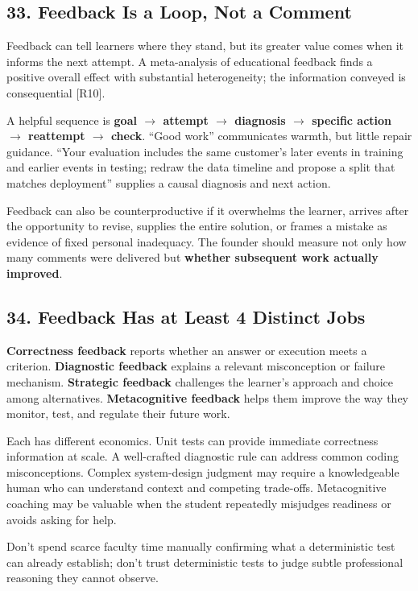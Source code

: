\subsection*{33. Feedback Is a Loop, Not a Comment}

Feedback can tell learners where they stand, but its greater value comes when it informs the next attempt. A meta-analysis of educational feedback finds a positive overall effect with substantial heterogeneity; the information conveyed is consequential [R10].

A helpful sequence is \textbf{goal $\to$ attempt $\to$ diagnosis $\to$ specific action $\to$ reattempt $\to$ check}. ``Good work'' communicates warmth, but little repair guidance. ``Your evaluation includes the same customer's later events in training and earlier events in testing; redraw the data timeline and propose a split that matches deployment'' supplies a causal diagnosis and next action.

Feedback can also be counterproductive if it overwhelms the learner, arrives after the opportunity to revise, supplies the entire solution, or frames a mistake as evidence of fixed personal inadequacy. The founder should measure not only how many comments were delivered but \textbf{whether subsequent work actually improved}.

\subsection*{34. Feedback Has at Least 4 Distinct Jobs}

\textbf{Correctness feedback} reports whether an answer or execution meets a criterion. \textbf{Diagnostic feedback} explains a relevant misconception or failure mechanism. \textbf{Strategic feedback} challenges the learner's approach and choice among alternatives. \textbf{Metacognitive feedback} helps them improve the way they monitor, test, and regulate their future work.

Each has different economics. Unit tests can provide immediate correctness information at scale. A well-crafted diagnostic rule can address common coding misconceptions. Complex system-design judgment may require a knowledgeable human who can understand context and competing trade-offs. Metacognitive coaching may be valuable when the student repeatedly misjudges readiness or avoids asking for help.

Don't spend scarce faculty time manually confirming what a deterministic test can already establish; don't trust deterministic tests to judge subtle professional reasoning they cannot observe.

